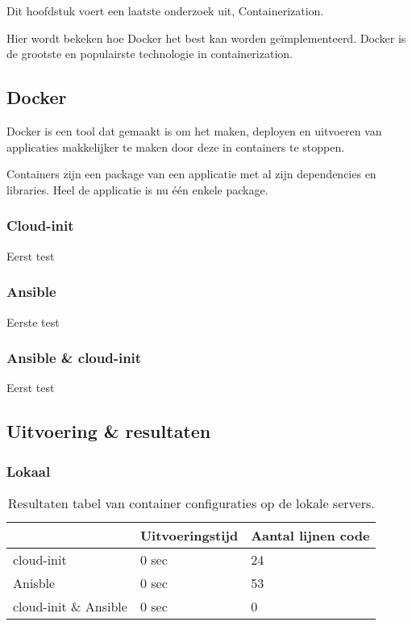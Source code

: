 \chapter{}
\label{ch:container}
Dit hoofdstuk voert een laatste onderzoek uit, Containerization.

Hier wordt bekeken hoe Docker het best kan worden geïmplementeerd. Docker is de grootste en populairste technologie in containerization.

\section{Docker}
Docker is een tool dat gemaakt is om het maken, deployen en uitvoeren van applicaties makkelijker te maken door deze in containers te stoppen. 

Containers zijn een package van een applicatie met al zijn dependencies en libraries. Heel de applicatie is nu één enkele package. \autocite{docker}


\subsection{Cloud-init}
Eerst test

\subsection{Ansible}
Eerste test

\subsection{Ansible \& cloud-init}
Eerst test

\section{Uitvoering \& resultaten}

\subsection{Lokaal}

\begin{table}[!htb]
	\centering
	\begin{tabular}{| l | l | l |}
		\hline
		& \textbf{Uitvoeringstijd} & \textbf{Aantal lijnen code}  \\ \hline
		cloud-init & 0 sec & 24 \\ \hline
		Anisble & 0 sec & 53 \\ \hline
		cloud-init \& Ansible & 0 sec & 0 \\
		\hline
	\end{tabular}
	\caption{Resultaten tabel van container configuraties op de lokale servers.}
	\label{tab:tabel lokale resultaten container}
\end{table}



